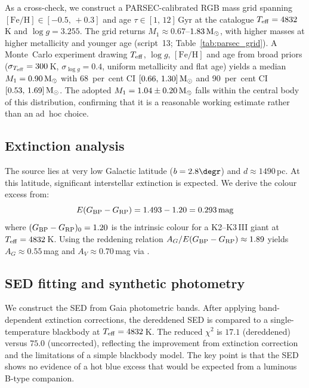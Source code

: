 \documentclass[usenatbib,fleqn]{mnras}
\newcommand{\Msun}{{\rm M}_\odot}
\begin{document}
As a cross-check, we construct a PARSEC-calibrated RGB mass grid
\citep{Bressan2012} spanning
$[\mathrm{Fe/H}] \in [-0.5,\,+0.3]$ and age
$\tau \in [1,\,12]\,$Gyr at the catalogue
$T_{\rm eff} = 4832\,$K and $\log g = 3.255$.  The grid returns
$M_1 \approx 0.67$--$1.83\,\Msun$, with higher masses at higher
metallicity and younger age
(script~13; Table~\ref{tab:parsec_grid}).  A Monte~Carlo
experiment drawing $T_{\rm eff}$, $\log g$, $[\mathrm{Fe/H}]$
and age from broad priors ($\sigma_{T_{\rm eff}} = 300\,$K,
$\sigma_{\log g} = 0.4$, uniform metallicity and flat age)
yields a median $M_1 = 0.90\,\Msun$ with 68~per~cent CI
$[0.66,\,1.30]\,\Msun$ and 90~per~cent CI
$[0.53,\,1.69]\,\Msun$.  The adopted
$M_1 = 1.04 \pm 0.20\,\Msun$ falls within the central
body of this distribution, confirming that it is a reasonable
working estimate rather than an ad~hoc choice.

\subsection{Extinction analysis}
\label{sec:methods:extinction}

The source lies at very low Galactic latitude
($b = 2.8\degr$) and $d \approx 1490$\,pc.  At this latitude,
significant interstellar extinction is expected.  We derive the
colour excess from:
\begin{equation}
E(G_{\rm BP} - G_{\rm RP}) = 1.493 - 1.20 = 0.293\,{\rm mag}
\end{equation}
where $(G_{\rm BP} - G_{\rm RP})_0 = 1.20$ is the intrinsic
colour for a K2--K3\,III giant at $T_{\rm eff} = 4832$\,K.  Using
the reddening relation $A_G / E(G_{\rm BP} - G_{\rm RP}) \approx
1.89$ \citep{GaiaCollaboration2023} yields $A_G \approx 0.55$\,mag
and $A_V \approx 0.70$\,mag via \citet{Cardelli1989}.

\subsection{SED fitting and synthetic photometry}
\label{sec:methods:sed}

We construct the SED from Gaia photometric bands.
After applying band-dependent extinction corrections, the
dereddened SED is compared to a single-temperature blackbody at
$T_{\rm eff} = 4832$\,K.  The reduced $\chi^2$ is $17.1$
(dereddened) versus $75.0$ (uncorrected), reflecting the
improvement from extinction correction and the limitations of a
simple blackbody model.  The key point is that the SED shows no
evidence of a hot blue excess that would be expected from a
luminous B-type companion.
\end{document}
